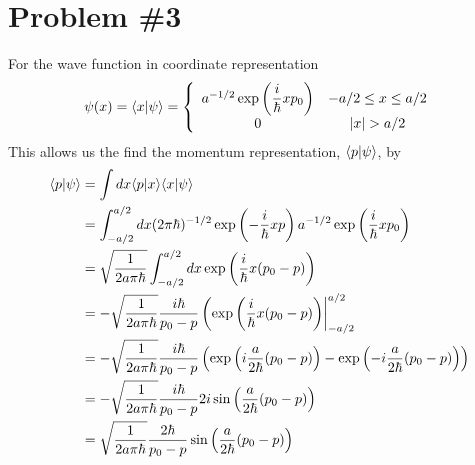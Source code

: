 \documentclass[11pt]{article}
\numberwithin{equation}{section}
\begin{document}
\section{Problem \#3}
For the wave function in coordinate representation
$$\psi(x) = \inprod{x}{\psi} = \left\{\begin{array}{cc}
                  a^{-1/2}\exp\left(\dfrac{i}{\hbar}xp_0\right)     &-a/2\le{x}\le{a/2}\\
                  0                                                &|x|>a/2
            \end{array}\right.$$
This allows us the find the momentum representation, $\langle{p}|{\psi}\rangle$, by
\begin{align*}
\langle{p}|{\psi}\rangle &= \int{dx}\langle{p}|{x}\rangle\langle{x}|{\psi}\rangle\\
&= \int_{-a/2}^{a/2}dx(2\pi\hbar)^{-1/2}\exp\left(-\frac{i}{\hbar}xp\right)a^{-1/2}\exp\left(\dfrac{i}{\hbar}xp_0\right)\\
&= \sqrt{\frac{1}{2a\pi\hbar}}\int_{-a/2}^{a/2}dx\exp\left(\frac{i}{\hbar}x(p_0-p)\right)\\
&= -\sqrt{\frac{1}{2a\pi\hbar}}\frac{i\hbar}{p_0-p}\left(\exp\left(\frac{i}{\hbar}x(p_0-p)\right)\right|_{-a/2}^{a/2}\\
&= -\sqrt{\frac{1}{2a\pi\hbar}}\frac{i\hbar}{p_0-p}\left(\exp\left(i\frac{a}{2\hbar}(p_0-p)\right)-\exp\left(-i\frac{a}{2\hbar}(p_0-p)\right)\right)\\
&= -\sqrt{\frac{1}{2a\pi\hbar}}\frac{i\hbar}{p_0-p}2i\sin\left(\frac{a}{2\hbar}(p_0-p)\right)\\
&= \sqrt{\frac{1}{2a\pi\hbar}}\frac{2\hbar}{p_0-p}\sin\left(\frac{a}{2\hbar}(p_0-p)\right)
\end{align*}
\pagebreak
\end{document}
